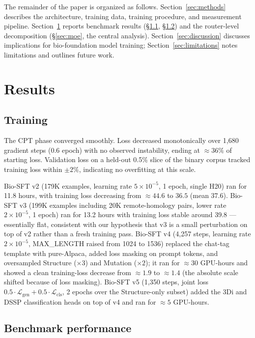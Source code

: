 \documentclass[11pt]{article}
\begin{document}
The remainder of the paper is organized as follows. Section~\ref{sec:methods} describes the architecture, training data, training procedure, and measurement pipeline. Section~\ref{sec:results} reports benchmark results (\S\ref{sec:training}, \S\ref{sec:benchmarks}) and the router-level decomposition (\S\ref{sec:moe}, the central analysis). Section~\ref{sec:discussion} discusses implications for bio-foundation model training; Section~\ref{sec:limitations} notes limitations and outlines future work.

\section{Results}
\label{sec:results}

\subsection{Training}
\label{sec:training}

The CPT phase converged smoothly. Loss decreased monotonically over 1{,}680 gradient steps (0.6 epoch) with no observed instability, ending at $\approx 36\%$ of starting loss. Validation loss on a held-out 0.5\% slice of the binary corpus tracked training loss within $\pm 2\%$, indicating no overfitting at this scale.

Bio-SFT v2 (179K examples, learning rate $5 \times 10^{-5}$, 1 epoch, single H20) ran for 11.8 hours, with training loss decreasing from $\approx 44.6$ to $36.5$ (mean 37.6). Bio-SFT v3 (199K examples including 20K remote-homology pairs, lower rate $2 \times 10^{-5}$, 1 epoch) ran for 13.2 hours with training loss stable around 39.8 --- essentially flat, consistent with our hypothesis that v3 is a small perturbation on top of v2 rather than a fresh training pass. Bio-SFT v4 (4{,}257 steps, learning rate $2 \times 10^{-5}$, MAX\_LENGTH raised from 1024 to 1536) replaced the chat-tag template with pure-Alpaca, added loss masking on prompt tokens, and oversampled Structure ($\times 3$) and Mutation ($\times 2$); it ran for $\approx 30$ GPU-hours and showed a clean training-loss decrease from $\approx 1.9$ to $\approx 1.4$ (the absolute scale shifted because of loss masking). Bio-SFT v5 (1{,}350 steps, joint loss $0.5 \cdot \mathcal{L}_{\text{gen}} + 0.5 \cdot \mathcal{L}_{\text{cls}}$, 2 epochs over the Structure-only subset) added the 3Di and DSSP classification heads on top of v4 and ran for $\approx 5$ GPU-hours.

\subsection{Benchmark performance}
\label{sec:benchmarks}
\end{document}
